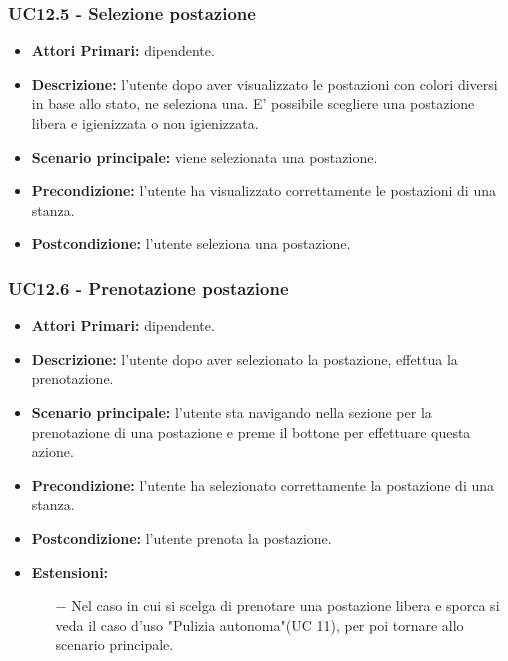 \subsubsection{ UC12.5 - Selezione postazione }
\begin{itemize}
	\item\textbf{Attori Primari:} dipendente.
	\item\textbf{Descrizione:} l’utente dopo aver visualizzato le postazioni con colori diversi in base allo stato, ne seleziona una. E' possibile scegliere una postazione libera e igienizzata o non igienizzata.
	\item\textbf{Scenario principale:} viene selezionata una postazione.
	\item\textbf{Precondizione:} l’utente ha visualizzato correttamente le postazioni di una stanza.
	\item\textbf{Postcondizione:} l’utente seleziona una postazione.
\end{itemize}
\subsubsection{ UC12.6 - Prenotazione postazione }
\begin{itemize}
	\item\textbf{Attori Primari:} dipendente.
	\item\textbf{Descrizione:} l’utente dopo aver selezionato la postazione, effettua la prenotazione. 
	\item\textbf{Scenario principale:} l’utente sta navigando nella sezione per la prenotazione di una postazione
	e preme il bottone per effettuare questa azione.
	\item\textbf{Precondizione:} l’utente ha selezionato correttamente la postazione di una stanza.
	\item\textbf{Postcondizione:} l'utente prenota la postazione.
	\item\textbf{Estensioni:}
	\begin{itemize}
		\item[$-$] Nel caso in cui si scelga di prenotare una postazione libera e sporca si veda il caso d'uso "Pulizia autonoma"(UC 11),
		per poi tornare allo scenario principale.
	\end{itemize}
\end{itemize}
